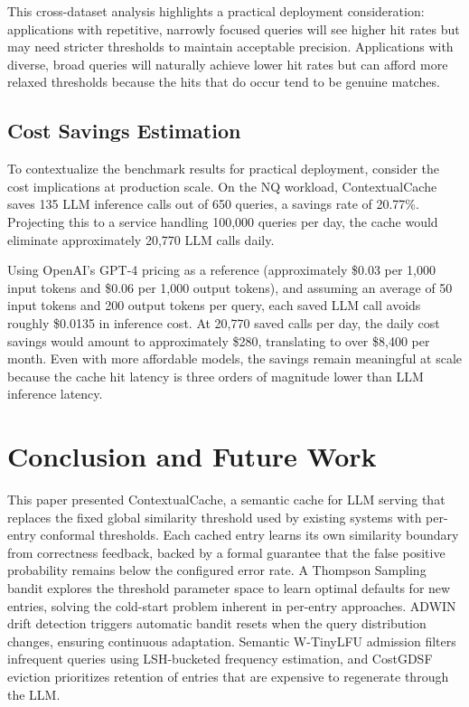 \documentclass[conference]{IEEEtran}
\begin{document}
This cross-dataset analysis highlights a practical deployment consideration: applications with repetitive, narrowly focused queries will see higher hit rates but may need stricter thresholds to maintain acceptable precision. Applications with diverse, broad queries will naturally achieve lower hit rates but can afford more relaxed thresholds because the hits that do occur tend to be genuine matches.

\subsection{Cost Savings Estimation}

To contextualize the benchmark results for practical deployment, consider the cost implications at production scale. On the NQ workload, ContextualCache saves 135 LLM inference calls out of 650 queries, a savings rate of 20.77\%. Projecting this to a service handling 100,000 queries per day, the cache would eliminate approximately 20,770 LLM calls daily.

Using OpenAI's GPT-4 pricing as a reference (approximately \$0.03 per 1,000 input tokens and \$0.06 per 1,000 output tokens), and assuming an average of 50 input tokens and 200 output tokens per query, each saved LLM call avoids roughly \$0.0135 in inference cost. At 20,770 saved calls per day, the daily cost savings would amount to approximately \$280, translating to over \$8,400 per month. Even with more affordable models, the savings remain meaningful at scale because the cache hit latency is three orders of magnitude lower than LLM inference latency.

\section{Conclusion and Future Work}

This paper presented ContextualCache, a semantic cache for LLM serving that replaces the fixed global similarity threshold used by existing systems with per-entry conformal thresholds. Each cached entry learns its own similarity boundary from correctness feedback, backed by a formal guarantee that the false positive probability remains below the configured error rate. A Thompson Sampling bandit explores the threshold parameter space to learn optimal defaults for new entries, solving the cold-start problem inherent in per-entry approaches. ADWIN drift detection triggers automatic bandit resets when the query distribution changes, ensuring continuous adaptation. Semantic W-TinyLFU admission filters infrequent queries using LSH-bucketed frequency estimation, and CostGDSF eviction prioritizes retention of entries that are expensive to regenerate through the LLM.
\end{document}
